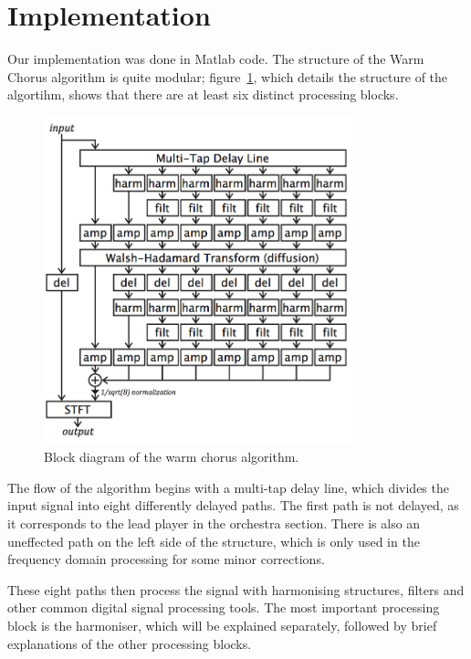 \section{Implementation}
Our implementation was done in Matlab code. The structure of the Warm Chorus algorithm is quite modular; figure~\ref{fig:struct}, which details the structure of the algortihm, shows that there are at least six distinct processing blocks.
\begin{figure}[ht]
\centering
\includegraphics[width= 9cm]{Structure.png}
\caption{Block diagram of the warm chorus algorithm. \cite{dudas}}
\label{fig:struct}
\end{figure}

The flow of the algorithm begins with a multi-tap delay line, which divides the input signal into eight differently delayed paths. The first path is not delayed, as it corresponds to the lead player in the orchestra section. There is also an uneffected path on the left side of the structure, which is only used in the frequency domain processing for some minor corrections.

These eight paths then process the signal with harmonising structures, filters and other common digital signal processing tools. The most important processing block is the harmoniser, which will be explained separately, followed by brief explanations of the other processing blocks. 
